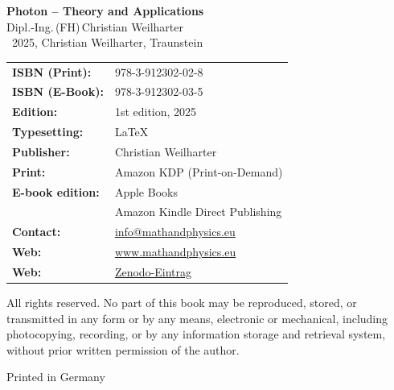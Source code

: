 \cleardoublepage
\thispagestyle{empty}
\begin{center}
	
	{\Large\textbf{Photon – Theory and Applications}}\\[1.2em]
	{\large Dipl.-Ing.\,(FH)\,Christian Weilharter}\\[1.2em]
	\textcopyright~2025, Christian Weilharter, Traunstein\\[2em]
\end{center}

\begin{flushleft}
	\begin{tabular}{@{}l l}
		\textbf{ISBN (Print):} & 978-3-912302-02-8 \\[0.5em]
		\textbf{ISBN (E-Book):} & 978-3-912302-03-5 \\[0.5em]
		\textbf{Edition:} & 1st edition, 2025 \\[0.5em]
		\textbf{Typesetting:} & \LaTeX \\[0.5em]
		\textbf{Publisher:} & Christian Weilharter \\[0.5em]

		\textbf{Print:} & Amazon KDP (Print-on-Demand) \\[0.5em]
		\textbf{E-book edition:} & Apple Books \\[0.5em]
		& Amazon Kindle Direct Publishing \\[0.5em]
		\textbf{Contact:} & \href{mailto:info@mathandphysics.de}{info@mathandphysics.eu} \\[0.5em]
		\textbf{Web:} & \href{https://www.mathandphysics.de}{www.mathandphysics.eu} \\
\textbf{Web:} & \href{https://zenodo.org/records/17404913}{Zenodo-Eintrag}\\

	\end{tabular}
\end{flushleft}

\vspace{2em}
\noindent
All rights reserved. No part of this book may be reproduced, stored, or transmitted
in any form or by any means, electronic or mechanical, including photocopying,
recording, or by any information storage and retrieval system, without prior written
permission of the author.

\begin{center}\small Printed in Germany\end{center}

\cleardoublepage


